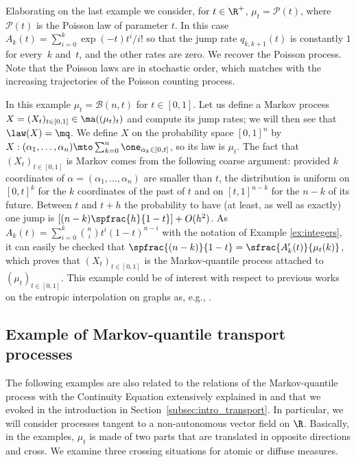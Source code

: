 \begin{ex}\label{ex:Poisson}
Elaborating on the last example we consider, for $t\in \R^+$, $\mu_t=\mathcal{P}(t)$, where $\mathcal{P}(t)$ is the Poisson law of parameter $t$. In this case $A_k(t)=\sum_{i=0}^k\exp(-t)t^i/i!$ so that the jump rate $q_{k,k+1}(t)$ is constantly $1$ for every~$k$ and~$t$, and the other rates are zero. We recover the Poisson process. Note that the Poisson laws are in stochastic order, which matches with the increasing trajectories of the Poisson counting process.
\end{ex}

\begin{ex}\label{ex:Binomial}
In this example $\mu_t=\mathcal{B}(n,t)$ for $t\in [0,1]$. Let us define a Markov process $X=(X_t)_{t\in[0,1]}\in\ma((\mu_t)_t)$ and compute its jump rates; we will then see that $\law(X)=\mq$. We define $X$ on the probability space $[0,1]^n$ by $X:(\alpha_1,\ldots,\alpha_n)\mto\sum_{k=0}^n \one_{\alpha_k\in[0,t]}$, so its law is $\mu_t$. The fact that $(X_t)_{t\in[0,1]}$ is Markov comes from the following coarse argument: provided $k$ coordinates of $\alpha=(\alpha_1,\ldots,\alpha_n)$ are smaller than $t$, the distribution is uniform on $[0,t]^k$ for the $k$ coordinates of the past of $t$ and on $[t,1]^{n-k}$ for the $n-k$ of its future. Between $t$ and $t+h$ the probability to have (at least, as well as exactly) one jump is $[(n-k)\spfrac{h}{1-t}]+O(h^2)$. As $A_k(t)=\sum_{i=0}^k \binom{n}{i} t^i(1-t)^{n-i}$ with the notation of Exam\-ple \ref{ex:integers}, it can easily be checked that $\spfrac{(n-k)}{1-t}=\sfrac{A'_k(t)}{\mu_t(k)}$, which proves that $(X_t)_{t\in[0,1]}$ is the Markov-quantile process attached to $(\mu_t)_{t\in[0,1]}$. This example could be of interest with respect to previous works on the entropic interpolation on graphs as, e.g., \cite{Hil_ejp,Leo16}.
\end{ex}

\subsection{Example of Markov-quantile transport processes}\label{ss:ex_CE}

The following examples are also related to the relations of the Markov-quantile process with the Continuity Equation extensively explained in \cite{BouJui2} and that we evoked in the introduction in Section~\ref{subsec:intro_transport}. In particular, we will consider processes tangent to a non-autonomous vector field on $\R$. Basically, in the examples, $\mu_t$ is made of two parts that are translated in opposite directions and cross. We examine three crossing situations for atomic or diffuse measures.

